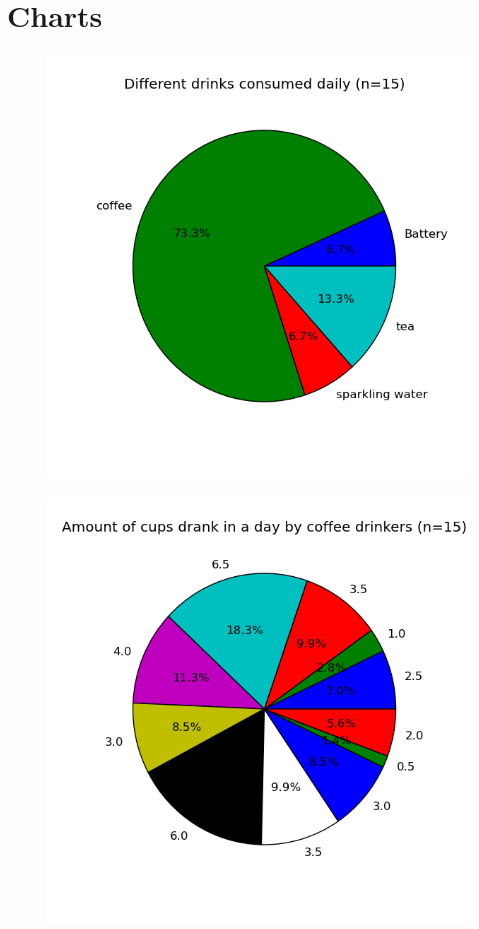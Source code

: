 \documentclass[a4paper,12pt]{article}
\begin{document}
\clearpage
\section{Charts}
\label{charts}

\begin{figure}[h]
  \includegraphics[width=\textwidth]{drinks.png}
\end{figure}

\begin{figure}[h]
  \includegraphics[width=\textwidth]{amounts.png}
\end{figure}
\end{document}
